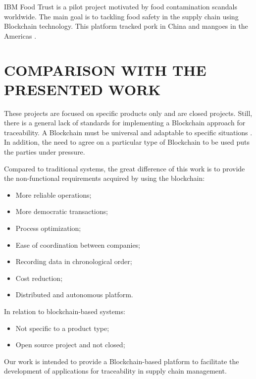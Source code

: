IBM Food Trust is a pilot project motivated by food contamination scandals worldwide. The main goal is to tackling food safety in the supply chain using Blockchain technology. This platform tracked pork in China and mangoes in the Americas \cite{kamath2018food}.

\section{COMPARISON WITH THE PRESENTED WORK} \label{sec:Comparison}
These projects are focused on specific products only and are closed projects. Still, there is a general lack of standards for implementing a Blockchain approach for traceability. A Blockchain must be universal and adaptable to specific situations \cite{valenta2017comparison}. In addition, the need to agree on a particular type of Blockchain to be used puts the parties under pressure. 

Compared to traditional systems, the great difference of this work is to provide the non-functional requirements acquired by using the blockchain:

\begin{itemize}
\item More reliable operations;
\item More democratic transactions;
\item Process optimization;
\item Ease of coordination between companies;
\item Recording data in chronological order;
\item Cost reduction;
\item Distributed and autonomous platform.
\end{itemize}

In relation to blockchain-based systems:

\begin{itemize}
\item Not specific to a product type;
\item Open source project and not closed;
\end{itemize}

Our work is intended to provide a Blockchain-based platform to facilitate the development of applications for traceability in supply chain management.

